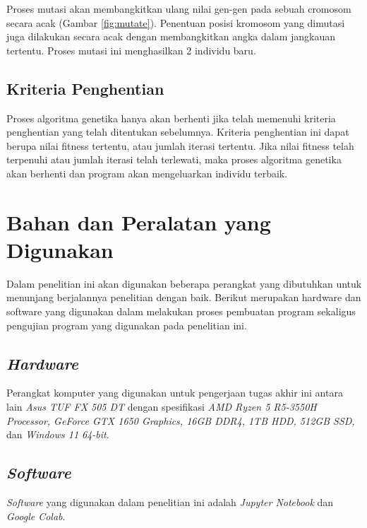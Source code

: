   Proses mutasi akan membangkitkan ulang nilai gen-gen pada sebuah cromosom secara acak (Gambar \ref{fig:mutate}). Penentuan posisi kromosom yang dimutasi juga dilakukan secara acak dengan membangkitkan angka dalam jangkauan tertentu. 
  Proses mutasi ini menghasilkan 2 individu baru.
  \subsection{Kriteria Penghentian}
  
  Proses algoritma genetika hanya akan berhenti jika telah memenuhi kriteria penghentian yang telah ditentukan sebelumnya. 
  Kriteria penghentian ini dapat berupa nilai fitness tertentu, atau jumlah iterasi tertentu. 
  Jika nilai fitness telah terpenuhi atau jumlah iterasi telah terlewati, maka proses algoritma genetika akan berhenti dan program akan mengeluarkan individu terbaik.

\section{Bahan dan Peralatan yang Digunakan}
Dalam penelitian ini akan digunakan beberapa perangkat yang dibutuhkan untuk menunjang berjalannya penelitian dengan baik.
Berikut merupakan hardware dan software yang digunakan dalam melakukan proses pembuatan program sekaligus pengujian program yang digunakan pada penelitian ini.
\subsection{\emph{Hardware}}
Perangkat komputer yang digunakan untuk pengerjaan tugas akhir ini antara lain \emph{Asus TUF FX 505 DT} dengan spesifikasi \emph{AMD Ryzen 5 R5-3550H Processor, GeForce GTX 1650 Graphics, 16GB DDR4, 1TB HDD, 512GB SSD,} dan \emph{Windows 11 64-bit}.
\subsection{\emph{Software}}
\emph{Software} yang digunakan dalam penelitian ini adalah \emph{Jupyter Notebook} dan \emph{Google Colab}.


